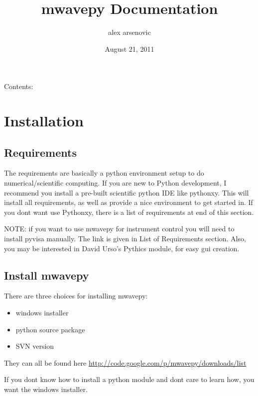 \documentclass[letterpaper,10pt,english]{sphinxmanual}
\title{mwavepy Documentation}
\date{August 21, 2011}
\author{alex arsenovic}
\begin{document}
\maketitle
\tableofcontents
{}\label{index::doc}


Contents:


\chapter{Installation}
\label{installation:mwavepy-s-documentation}\label{installation::doc}\label{installation:installation}\label{installation:id1}

\section{Requirements}
\label{installation:requirements}
The requirements are basically a python environment setup to do numerical/scientific computing. If you are new to Python development, I recommend you install a pre-built scientific python IDE like pythonxy. This will install all requirements, as well as provide a nice environment to get started in. If you dont want use Pythonxy, there is a list of requirements at end of this section.

NOTE: if you want to use mwavepy for instrument control you will need to install pyvisa manually. The link is given in List of Requirements section. Also, you may be interested in David Urso's Pythics module, for easy gui creation.


\section{Install mwavepy}
\label{installation:install-mwavepy}
There are three choices for installing mwavepy:
\begin{itemize}
\item {} 
windows installer

\item {} 
python source package

\item {} 
SVN version

\end{itemize}

They can all be found here \href{http://code.google.com/p/mwavepy/downloads/list}{http://code.google.com/p/mwavepy/downloads/list}

If you dont know how to install a python module and dont care to learn how, you want the windows installer.
\end{document}
